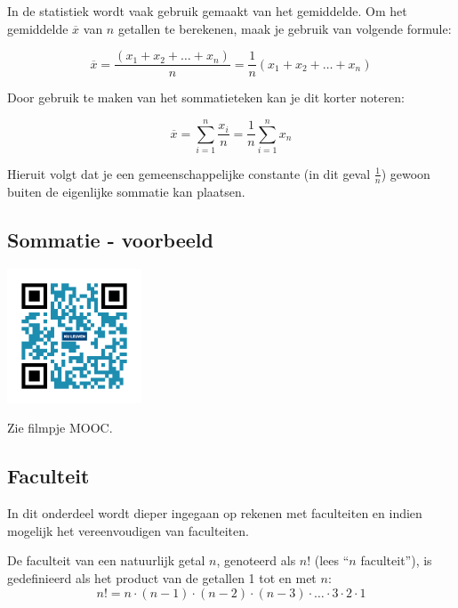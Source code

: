 In de statistiek wordt vaak gebruik gemaakt van het gemiddelde. Om het gemiddelde $\overline{x}$ van $n$ getallen te berekenen, maak je gebruik van volgende formule:

\begin{equation*}
\overline{x} = \frac{(x_1+x_2+\ldots+x_n)}{n}=\frac{1}{n}(x_1+x_2+\ldots+x_n)
\end{equation*}

Door gebruik te maken van het sommatieteken kan je dit korter noteren:

\begin{equation*}
\overline{x}=\sum_{i=1}^{n}\frac{x_i}{n} = \frac{1}{n} \sum_{i=1}^{n} x_n
\end{equation*}

Hieruit volgt dat je een gemeenschappelijke constante (in dit geval $\frac{1}{n}$) gewoon buiten de eigenlijke sommatie kan plaatsen.



\subsection{Sommatie - voorbeeld}
\begin{minipage}{.25\linewidth}
	\raggedright
	\includegraphics[width=4cm]{1_elem_rekenvaardigheden_A/inputs/QR_Code_SOMMATIE_module_1}
\end{minipage}
\begin{minipage}{.7\linewidth}
	Zie filmpje MOOC.
\end{minipage}

\subsection{Faculteit}
In dit onderdeel wordt dieper ingegaan op rekenen met faculteiten en indien mogelijk het vereenvoudigen van faculteiten.

\begin{definitie}
	De faculteit van een natuurlijk getal $n$, genoteerd als $n!$ (lees “$n$ faculteit”), is gedefinieerd als het product van de getallen 1 tot en met $n$:
	\begin{equation*}
	n!=n\cdot(n-1)\cdot(n-2)\cdot(n-3)\cdot\ldots\cdot 3\cdot 2\cdot 1
	\end{equation*}
\end{definitie}

